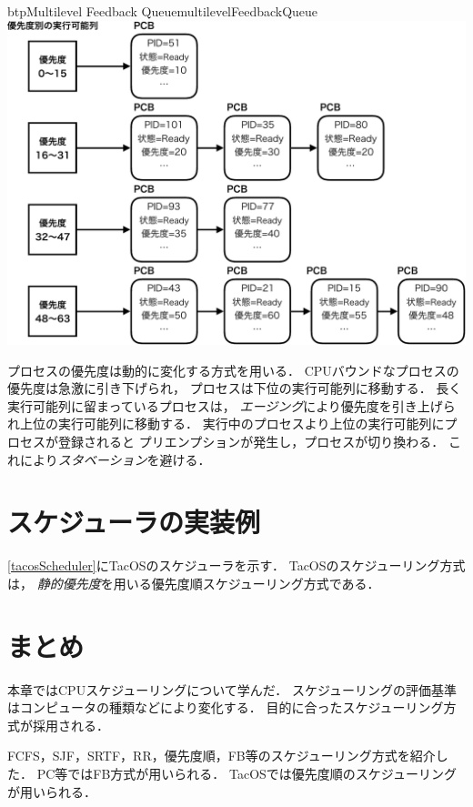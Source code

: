 \begin{myfig}{btp}{Multilevel Feedback Queue}{multilevelFeedbackQueue}
  \includegraphics[scale=0.6]{Fig/multilevelFeedbackQueue-crop.pdf}
\end{myfig}

プロセスの優先度は動的に変化する方式を用いる．
CPUバウンドなプロセスの優先度は急激に引き下げられ，
プロセスは下位の実行可能列に移動する．
長く実行可能列に留まっているプロセスは，
\emph{エージング}により優先度を引き上げられ上位の実行可能列に移動する．
実行中のプロセスより上位の実行可能列にプロセスが登録されると
プリエンプションが発生し，プロセスが切り換わる．
これにより\emph{スタベーション}を避ける．

\section{スケジューラの実装例}
\ref{tacosScheduler}にTacOSのスケジューラを示す．
TacOSのスケジューリング方式は，
\emph{静的優先度}を用いる優先度順スケジューリング方式である．

\section{まとめ}
本章ではCPUスケジューリングについて学んだ．
スケジューリングの評価基準はコンピュータの種類などにより変化する．
目的に合ったスケジューリング方式が採用される．

FCFS，SJF，SRTF，RR，優先度順，FB等のスケジューリング方式を紹介した．
PC等ではFB方式が用いられる．
TacOSでは優先度順のスケジューリングが用いられる．

